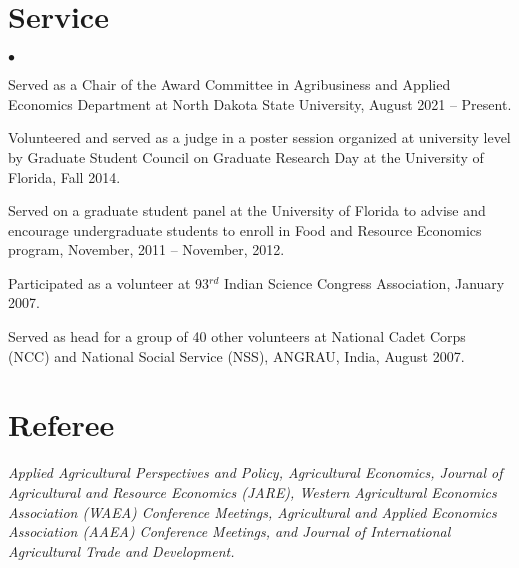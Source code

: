\documentclass[margin,line]{res}
\newenvironment{list2}{
  \begin{list}{$\bullet$}{%
    \setlength{\itemsep}{0in}
    \setlength{\parsep}{0in} \setlength{\parskip}{0in}
    \setlength{\topsep}{0in} \setlength{\partopsep}{0in}
    \setlength{\leftmargin}{0.2in}}}{\end{list}}
\begin{document}
\begin{resume}
\section{\sc Service}
\begin{list2}
\item Served as a Chair of the Award Committee in Agribusiness and Applied Economics Department at North Dakota State University, August 2021 -- Present.
\item Volunteered and served as a judge in a poster session organized at university level by Graduate Student Council on Graduate Research Day at the University of Florida, Fall 2014.
\item Served on a graduate student panel at the University of Florida to advise and encourage undergraduate students to enroll in Food and Resource Economics program, November, 2011 -- November, 2012.
\item Participated as a volunteer at 93$^{rd}$ Indian Science Congress Association, January 2007.
\item Served as head for a group of 40 other volunteers at National Cadet Corps (NCC) and National Social Service (NSS), ANGRAU, India, August 2007.
\end{list2}

\section{\sc Referee}
\textit{Applied Agricultural Perspectives and Policy, Agricultural Economics, Journal of Agricultural and Resource Economics (JARE), Western Agricultural Economics Association (WAEA) Conference Meetings, Agricultural and Applied Economics Association (AAEA) Conference Meetings, and Journal of International Agricultural Trade and Development.}

\begin{comment}
\section{\sc Popular Press}
\begin{list2}
\item \href{http://agweek.com/business/agriculture/4496122-tariffs-india-china-hit-pulse-producers}{\say{Tariffs in India and China hit Pulse Producers.}}\textit{AgWeek.}
\item \href{http://www.agweek.com/business/agriculture/4401264-spotlight-economics-nafta-renegotiation-and-issues-related-sweetener}{\say{NAFTA renegotiation and issues related to sweetener trade.}}\textit{AgWeek.}
\item \href{https://www.morningagclips.com/nafta-renegotiation-and-the-sweetener-trade/}{\say{NAFTA renegotiation and the sweetener trade.}}\textit{Morning AgClips.}
\item \href{https://www.dairyherd.com/article/what-big-data-context-agriculture}{\say{What is Big Data in the Context of Agriculture?}}\textit{Dairy Herd Management.}


\end{comment}
\end{resume}
\end{document}
